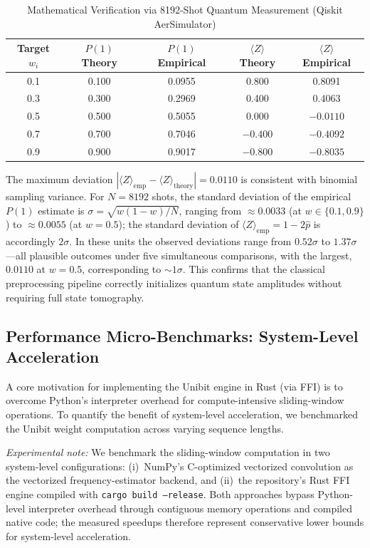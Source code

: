 ﻿\documentclass[12pt,a4paper]{article}
\begin{document}
\begin{table}[H]
\centering
\caption{Mathematical Verification via 8192-Shot Quantum Measurement (Qiskit AerSimulator)}
\label{tab:math_verify}
\small
\begin{tabular}{@{}ccccc@{}}
\hline
\textbf{Target $w_i$} & \textbf{$P(1)$ Theory} & \textbf{$P(1)$ Empirical} & \textbf{$\langle Z \rangle$ Theory} & \textbf{$\langle Z \rangle$ Empirical} \\
\hline
0.1 & 0.100 & 0.0955 & 0.800 & 0.8091 \\
0.3 & 0.300 & 0.2969 & 0.400 & 0.4063 \\
0.5 & 0.500 & 0.5055 & 0.000 & $-0.0110$ \\
0.7 & 0.700 & 0.7046 & $-0.400$ & $-0.4092$ \\
0.9 & 0.900 & 0.9017 & $-0.800$ & $-0.8035$ \\
\hline
\end{tabular}
\end{table}

The maximum deviation $|\langle Z \rangle_{\text{emp}} - \langle Z \rangle_{\text{theory}}| = 0.0110$ is consistent with binomial sampling variance. For $N = 8192$ shots, the standard deviation of the empirical $P(1)$ estimate is $\sigma = \sqrt{w(1-w)/N}$, ranging from $\approx 0.0033$ (at $w \in \{0.1, 0.9\}$) to $\approx 0.0055$ (at $w = 0.5$); the standard deviation of $\langle Z \rangle_{\text{emp}} = 1 - 2\hat{p}$ is accordingly $2\sigma$. In these units the observed deviations range from $0.52\sigma$ to $1.37\sigma$---all plausible outcomes under five simultaneous comparisons, with the largest, $0.0110$ at $w = 0.5$, corresponding to $\sim 1\sigma$. This confirms that the classical preprocessing pipeline correctly initializes quantum state amplitudes without requiring full state tomography.

\subsection{Performance Micro-Benchmarks: System-Level Acceleration}

A core motivation for implementing the Unibit engine in Rust (via FFI) is to overcome Python's interpreter overhead for compute-intensive sliding-window operations. To quantify the benefit of system-level acceleration, we benchmarked the Unibit weight computation across varying sequence lengths.

\textit{Experimental note:} We benchmark the sliding-window computation in two system-level configurations: (i)~NumPy's C-optimized vectorized convolution as the vectorized frequency-estimator backend, and (ii)~the repository's Rust FFI engine compiled with \texttt{cargo build --release}. Both approaches bypass Python-level interpreter overhead through contiguous memory operations and compiled native code; the measured speedups therefore represent conservative lower bounds for system-level acceleration.
\end{document}
